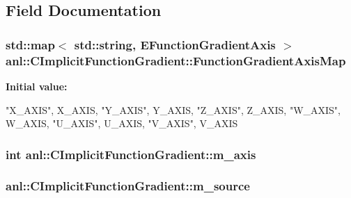 \subsection{Field Documentation}
\hypertarget{classanl_1_1CImplicitFunctionGradient_a6b1075c325651c7a4f9803c2eb18ae09}{
\subsubsection[{FunctionGradientAxisMap}]{\setlength{\rightskip}{0pt plus 5cm}std::map$<$ std::string, {\bf EFunctionGradientAxis} $>$ {\bf anl::CImplicitFunctionGradient::FunctionGradientAxisMap}}}
\label{classanl_1_1CImplicitFunctionGradient_a6b1075c325651c7a4f9803c2eb18ae09}
{\bfseries Initial value:}
\begin{DoxyCode}
 {
        {"X_AXIS", X_AXIS},
        {"Y_AXIS", Y_AXIS},
        {"Z_AXIS", Z_AXIS},
        {"W_AXIS", W_AXIS},
        {"U_AXIS", U_AXIS},
        {"V_AXIS", V_AXIS}
    }
\end{DoxyCode}
\hypertarget{classanl_1_1CImplicitFunctionGradient_a083f61a863fe96c228a297c4056dd55d}{
\subsubsection[{m\_\-axis}]{\setlength{\rightskip}{0pt plus 5cm}int {\bf anl::CImplicitFunctionGradient::m\_\-axis}}}
\label{classanl_1_1CImplicitFunctionGradient_a083f61a863fe96c228a297c4056dd55d}
\hypertarget{classanl_1_1CImplicitFunctionGradient_a13b46a71cb6454ac806b82a104acf7b2}{
\subsubsection[{m\_\-source}]{ {\bf anl::CImplicitFunctionGradient::m\_\-source}}}
